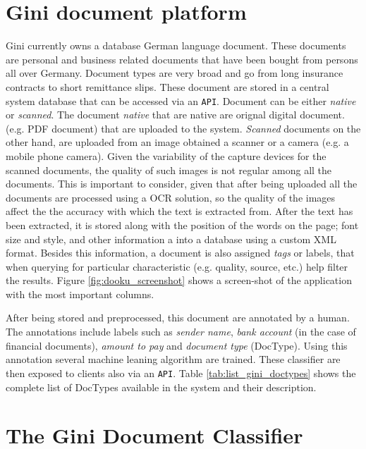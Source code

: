 \section{Gini document platform}
\label{sec:gini_doc_platform}

Gini currently owns a database  German language document. These documents 
are personal and business related documents that have been bought 
from  persons all over Germany. Document types are very broad and go from
long insurance contracts to short remittance slips. These document are stored
in a central system database that can be accessed via an  \texttt{API}.
Document can be either \textit{native} or \textit{scanned}. The document
\textit{native} that are native are orignal digital document. (e.g. PDF document) that
are uploaded to the system. \textit{Scanned} documents on the other hand, are
uploaded from an image obtained a scanner or a camera (e.g. a mobile phone
camera). Given the variability of the capture devices for the scanned
documents, the quality of such images is not regular among all the documents.
This is important to consider, given that after being uploaded all the
documents are processed using a \ac{OCR} solution, so the quality of the
images affect the the accuracy with which the text is extracted from. 
After the text has been extracted, it is stored  along with
the position of the words on the page; font size and style,  and other information a into a database using a custom
\textsc{XML} format.  Besides this information, a document is also assigned
\textit{tags} or labels, that when querying for particular characteristic
(e.g. quality, source, etc.) help filter the results. Figure
\ref{fig:dooku_screenshot} shows a screen-shot of the application with the
most important columns.


After being stored and preprocessed, this document are annotated by a human.
The annotations include labels such as  \textit{sender name}, \textit{bank
  account} (in the case of financial documents), \textit{amount to pay} and
\textit{document type} (\ac{DocType}). Using this annotation several
machine leaning algorithm are trained.  These classifier are then exposed to
clients also via an \texttt{API}. Table \ref{tab:list_gini_doctypes} shows the
complete list of \ac{DocTypes} available in the system and their description.


\section{The Gini Document Classifier}  
\label{sec:gini_doctype_classifier}

